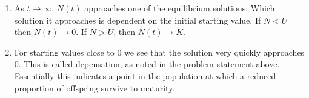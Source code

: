\documentclass[12pt]{article}
\newenvironment{exercise}[2][Exercise]{\begin{trivlist}
\item[\hskip \labelsep {\bfseries #1}\hskip \labelsep {\bfseries #2.}]}{\end{trivlist}}
\begin{document}
\begin{exercise}{3}
\begin{enumerate}
\begin{center}
	\end{center}
	\item[d)] As $t \rightarrow \infty$, $N(t)$ approaches one of the equilibrium solutions. Which solution it approaches is dependent on the initial starting value. If $N < U$ then $N(t) \rightarrow 0$. If $N > U$, then $N(t) \rightarrow K$. 
	\item[e)] For starting values close to $0$ we see that the solution very quickly approaches $0$. This is called depensation, as noted in the problem statement above. Essentially this indicates a point in the population at which a reduced proportion of offspring survive to maturity. 
\end{enumerate}
\end{exercise}

 
\end{document}
